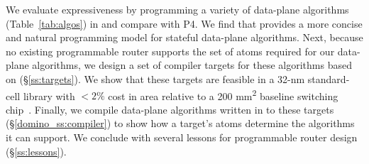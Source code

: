 

We evaluate expressiveness by programming a variety of data-plane algorithms
(Table~\ref{tab:algos}) in \pktlanguage and compare with P4. We find that
\pktlanguage provides a more concise and natural programming model for stateful
data-plane algorithms.  Next, because no existing programmable router supports
the set of atoms required for our data-plane algorithms, we design a set of
compiler targets for these algorithms based on \absmachine
(\S\ref{ss:targets}).  We show that these targets are feasible in a 32-nm
standard-cell library with $< 2\%$ cost in area relative to a 200
\si{\milli\metre\squared} baseline switching chip~\cite{gibb_parsing}.
Finally, we compile data-plane algorithms written in \pktlanguage to these
targets (\S\ref{domino_ss:compiler}) to show how a target's atoms determine the
algorithms it can support. We conclude with several lessons for programmable
router design (\S\ref{ss:lessons}).


